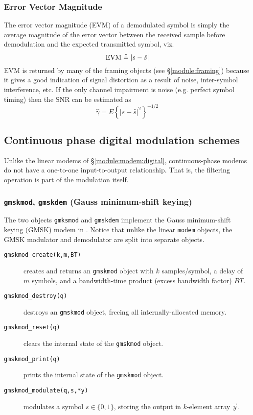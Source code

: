 \subsubsection{Error Vector Magnitude}
\label{module:modem:digital:evm}
The error vector magnitude (EVM) of a demodulated symbol is simply the
average magnitude of the error vector between the received sample
before demodulation and the expected transmitted symbol, viz.
%
\begin{equation}
\label{eqn:modem:evm}
    \textup{EVM} \triangleq \left| s - \hat{s} \right|
\end{equation}
%
EVM is returned by many of the framing objects
(see \S\ref{module:framing})
because it gives a good indication of signal distortion as a result of
noise, inter-symbol interference, etc.
If the only channel impairment is noise (e.g. perfect symbol timing)
then the SNR can be estimated as
\[
    \hat{\gamma} = E\left\{ \left| s - \hat{s} \right|^2 \right\}^{-1/2}
\]


%
%

\subsection{Continuous phase digital modulation schemes}
\label{module:modem:cpm}

Unlike the linear modems of \S\ref{module:modem:digital},
continuous-phase modems do not have a one-to-one input-to-output
relationship.
That is, the filtering operation is part of the modulation itself.


\subsubsection{{\tt gmskmod}, {\tt gmskdem} (Gauss minimum-shift keying)}
\label{module:modem:cpm:gmskmodem}

The two objects {\tt gmksmod} and {\tt gmskdem} implement the Gauss
minimum-shift keying (GMSK) modem in \liquid.
Notice that unlike the linear {\tt modem} objects, the GMSK
modulator and demodulator are split into separate objects.

%
\begin{description}
\item[{\tt gmskmod\_create(k,m,BT)}]
    creates and returns an {\tt gmskmod} object with
    $k$ samples/symbol,
    a delay of $m$ symbols,
    and a bandwidth-time product (excess bandwidth factor) $BT$.
\item[{\tt gmskmod\_destroy(q)}]
    destroys an {\tt gmskmod} object, freeing all internally-allocated
    memory.
\item[{\tt gmskmod\_reset(q)}]
    clears the internal state of the {\tt gmskmod} object.
\item[{\tt gmskmod\_print(q)}]
    prints the internal state of the {\tt gmskmod} object.
\item[{\tt gmskmod\_modulate(q,s,*y)}]
    modulates a symbol $s \in \{0,1\}$,
    storing the output in $k$-element array $\vec{y}$.
\end{description}

